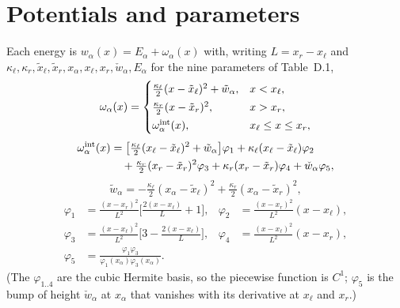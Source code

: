 \documentclass[11pt,a4paper]{article}
\begin{document}
\section{Potentials and parameters}
\label{app:params}
Each energy is $w_\alpha(x)=E_\alpha+\omega_\alpha(x)$ with, writing $L=x_r-x_\ell$ and $\kappa_\ell,\kappa_r,\tilde x_\ell,\tilde x_r,x_\alpha,x_\ell,x_r,\check w_\alpha,E_\alpha$ for the nine parameters of Table~D.1,
\begin{equation}
\omega_\alpha(x)=\begin{cases}
\tfrac{\kappa_\ell}{2}(x-\tilde x_\ell)^2+\tilde w_\alpha, & x<x_\ell,\\[2pt]
\tfrac{\kappa_r}{2}(x-\tilde x_r)^2, & x>x_r,\\[2pt]
\omega^{\rm int}_\alpha(x), & x_\ell\le x\le x_r,
\end{cases}
\end{equation}
\begin{align}
\omega^{\rm int}_\alpha(x)&=\big[\tfrac{\kappa_\ell}{2}(x_\ell-\tilde x_\ell)^2+\tilde w_\alpha\big]\varphi_1+\kappa_\ell(x_\ell-\tilde x_\ell)\varphi_2\nonumber\\
&\quad+\tfrac{\kappa_r}{2}(x_r-\tilde x_r)^2\varphi_3+\kappa_r(x_r-\tilde x_r)\varphi_4+\check w_\alpha\varphi_5,
\end{align}
\begin{equation}
\tilde w_\alpha=-\tfrac{\kappa_\ell}{2}(x_\alpha-\tilde x_\ell)^2+\tfrac{\kappa_r}{2}(x_\alpha-\tilde x_r)^2,
\end{equation}
\begin{align}
\varphi_1&=\tfrac{(x-x_r)^2}{L^2}\Big[\tfrac{2(x-x_\ell)}{L}+1\Big], & \varphi_2&=\tfrac{(x-x_r)^2}{L^2}(x-x_\ell),\\
\varphi_3&=\tfrac{(x-x_\ell)^2}{L^2}\Big[3-\tfrac{2(x-x_\ell)}{L}\Big], & \varphi_4&=\tfrac{(x-x_\ell)^2}{L^2}(x-x_r),\\
\varphi_5&=\tfrac{\varphi_1\varphi_3}{\varphi_1(x_\alpha)\varphi_3(x_\alpha)}. &&
\end{align}
(The $\varphi_{1..4}$ are the cubic Hermite basis, so the piecewise function is $C^1$; $\varphi_5$ is the bump of height $\check w_\alpha$ at $x_\alpha$ that vanishes with its derivative at $x_\ell$ and $x_r$.)
\end{document}
